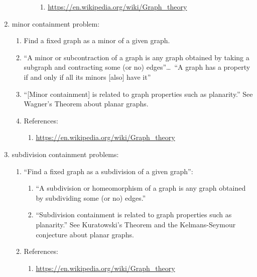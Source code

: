 \begin{enumerate}
\begin{enumerate}
\begin{enumerate}
			\begin{enumerate} \itemsep -1pt
			\item \url{https://en.wikipedia.org/wiki/Graph_theory}
			\end{enumerate}
		\end{enumerate}
	\end{enumerate}
\item minor containment problem: \vspace{-0.3cm}
	\begin{enumerate} \itemsep -2pt
	\item Find a fixed graph as a minor of a given graph.
	\item ``A minor or subcontraction of a graph is any graph obtained by taking a subgraph and contracting some (or no) edges''\dots\ ``A graph has a property if and only if all its minors [also] have it''
	\item ``[Minor containment] is related to graph properties such as planarity.'' See Wagner's Theorem about planar graphs.
	\item References: \vspace{-0.2cm}
		\begin{enumerate} \itemsep -2pt
		\item \url{https://en.wikipedia.org/wiki/Graph_theory}
		\end{enumerate}
	\end{enumerate}
\item subdivision containment problems: \vspace{-0.3cm}
	\begin{enumerate} \itemsep -2pt
	\item ``Find a fixed graph as a subdivision of a given graph'': \vspace{-0.2cm}
		\begin{enumerate} \itemsep -2pt
		\item ``A subdivision or homeomorphism of a graph is any graph obtained by subdividing some (or no) edges.''
		\item ``Subdivision containment is related to graph properties such as planarity.'' See Kuratowski's Theorem and the Kelmans-Seymour conjecture about planar graphs.
		\end{enumerate}
	\item References: \vspace{-0.2cm}
		\begin{enumerate} \itemsep -2pt
		\item \url{https://en.wikipedia.org/wiki/Graph_theory}
		\end{enumerate}
	\end{enumerate}
\end{enumerate}

